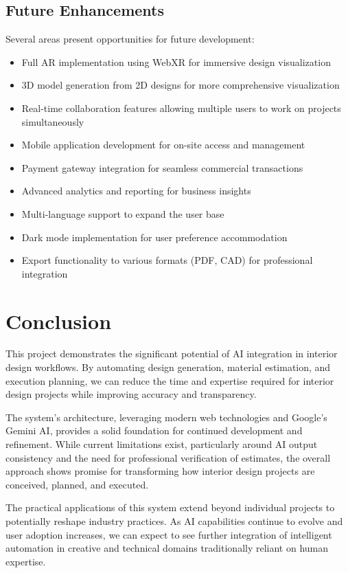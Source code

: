\documentclass[conference]{IEEEtran}
\begin{document}
\subsection{Future Enhancements}
Several areas present opportunities for future development:
\begin{itemize}
    \item Full AR implementation using WebXR for immersive design visualization
    \item 3D model generation from 2D designs for more comprehensive visualization
    \item Real-time collaboration features allowing multiple users to work on projects simultaneously
    \item Mobile application development for on-site access and management
    \item Payment gateway integration for seamless commercial transactions
    \item Advanced analytics and reporting for business insights
    \item Multi-language support to expand the user base
    \item Dark mode implementation for user preference accommodation
    \item Export functionality to various formats (PDF, CAD) for professional integration
\end{itemize}

\section{Conclusion}
This project demonstrates the significant potential of AI integration in interior design workflows. By automating design generation, material estimation, and execution planning, we can reduce the time and expertise required for interior design projects while improving accuracy and transparency.

The system's architecture, leveraging modern web technologies and Google's Gemini AI, provides a solid foundation for continued development and refinement. While current limitations exist, particularly around AI output consistency and the need for professional verification of estimates, the overall approach shows promise for transforming how interior design projects are conceived, planned, and executed.

The practical applications of this system extend beyond individual projects to potentially reshape industry practices. As AI capabilities continue to evolve and user adoption increases, we can expect to see further integration of intelligent automation in creative and technical domains traditionally reliant on human expertise.
\end{document}
